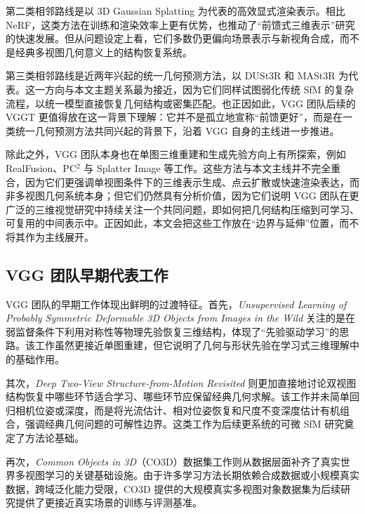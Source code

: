 第二类相邻路线是以 3D Gaussian Splatting 为代表的高效显式渲染表示\cite{kerbl2023gaussiansplatting}。相比 NeRF，这类方法在训练和渲染效率上更有优势，也推动了“前馈式三维表示”研究的快速发展。但从问题设定上看，它们多数仍更偏向场景表示与新视角合成，而不是经典多视图几何意义上的结构恢复系统。

第三类相邻路线是近两年兴起的统一几何预测方法，以 DUSt3R 和 MASt3R 为代表\cite{wang2024dust3r,mast3r2024}。这一方向与本文主题关系最为接近，因为它们同样试图弱化传统 SfM 的复杂流程，以统一模型直接恢复几何结构或密集匹配。也正因如此，VGG 团队后续的 VGGT 更值得放在这一背景下理解：它并不是孤立地宣称“前馈更好”，而是在一类统一几何预测方法共同兴起的背景下，沿着 VGG 自身的主线进一步推进。

除此之外，VGG 团队本身也在单图三维重建和生成先验方向上有所探索，例如 RealFusion、PC$^2$ 与 Splatter Image 等工作\cite{melaskyriazi2023realfusion,melaskyriazi2023pc2,szymanowicz2024splatter}。这些方法与本文主线并不完全重合，因为它们更强调单视图条件下的三维表示生成、点云扩散或快速渲染表达，而非多视图几何系统本身；但它们仍然具有分析价值，因为它们说明 VGG 团队在更广泛的三维视觉研究中持续关注一个共同问题，即如何把几何结构压缩到可学习、可复用的中间表示中。正因如此，本文会把这些工作放在“边界与延伸”位置，而不将其作为主线展开。

\subsection{VGG 团队早期代表工作}

VGG 团队的早期工作体现出鲜明的过渡特征。首先，\textit{Unsupervised Learning of Probably Symmetric Deformable 3D Objects from Images in the Wild} 关注的是在弱监督条件下利用对称性等物理先验恢复三维结构，体现了“先验驱动学习”的思路\cite{wu2020unsup3d}。该工作虽然更接近单图重建，但它说明了几何与形状先验在学习式三维理解中的基础作用。

其次，\textit{Deep Two-View Structure-from-Motion Revisited} 则更加直接地讨论双视图结构恢复中哪些环节适合学习、哪些环节应保留经典几何求解\cite{wang2021deep2view}。该工作并未简单回归相机位姿或深度，而是将光流估计、相对位姿恢复和尺度不变深度估计有机组合，强调经典几何问题的可解性边界。这类工作为后续更系统的可微 SfM 研究奠定了方法论基础。

再次，\textit{Common Objects in 3D}（CO3D）数据集工作则从数据层面补齐了真实世界多视图学习的关键基础设施\cite{reizenstein2021co3d}。由于许多学习方法长期依赖合成数据或小规模真实数据，跨域泛化能力受限，CO3D 提供的大规模真实多视图对象数据集为后续研究提供了更接近真实场景的训练与评测基准。

